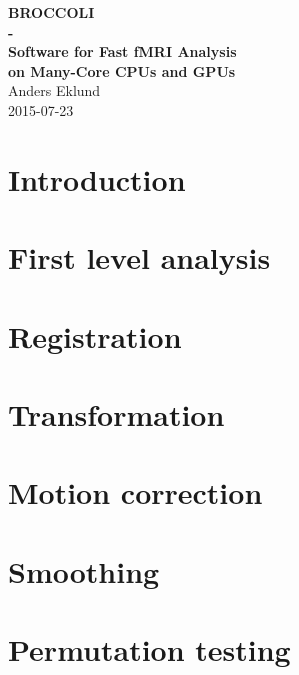 \documentclass[11pt,a4paper]{book}
\makeatletter
\def\cleardoublepage{\clearpage\if@twoside \ifodd\c@page\else
\hbox{}
\thispagestyle{empty}     
\newpage 
\if@twocolumn\hbox{}\newpage\fi\fi\fi}
\makeatother
\begin{document}



\thispagestyle{empty}
\makeatletter
\begin{center}
  {\huge \textbf{BROCCOLI \\ - \\ Software for Fast fMRI Analysis \\ on Many-Core CPUs and GPUs}}\\[1 cm]
  {\Large Anders Eklund}\\[1.5 cm]
  {\Large 2015-07-23}\\[1.5 cm]
\end{center}


\renewcommand{\contentsname}{Table of Contents}
\tableofcontents



%


\chapter{Introduction}
\label{sec:intro}


\cleardoublepage
\newpage
\chapter{First level analysis}
\label{sec:firstlevel}


\cleardoublepage
\newpage
\chapter{Registration}
\label{sec:registration}


\cleardoublepage
\newpage
\chapter{Transformation}
\label{sec:transformation}


\cleardoublepage
\newpage
\chapter{Motion correction}
\label{sec:motion}


\cleardoublepage
\newpage
\chapter{Smoothing}
\label{sec:smoothing}


\cleardoublepage
\newpage
\chapter{Permutation testing}
\label{sec:randomise}





\cleardoublepage
\end{document}
